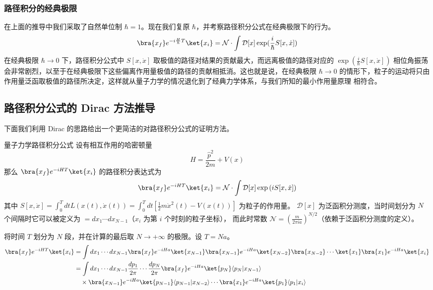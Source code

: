 \subsubsection{路径积分的经典极限}
在上面的推导中我们采取了自然单位制 $\hbar=1$。现在我们复原 $\hbar$，并考察路径积分公式在经典极限下的行为。
\begin{equation}
\bra{x_f} e^{-i\frac{H}{\hbar}T}\ket{x_i}=\mathcal{N}\cdot \int \mathcal{D}[x] \exp(\frac{i}{\hbar}S[x,\dot x])
\end{equation}
在经典极限 $\hbar\rightarrow 0$ 下，路径积分公式中 $S[x,\dot x]$ 取极值的路径对结果的贡献最大，而远离极值的路径对应的 $\exp(\frac{i}{\hbar}S[x,\dot x])$ 相位角振荡会非常剧烈，以至于在经典极限下这些偏离作用量极值的路径的贡献相抵消。这也就是说，在经典极限 $\hbar\rightarrow 0$ 的情形下，粒子的运动将只由作用量泛函取极值的路径所决定，这样就从量子力学的情况退化到了经典力学体系，与我们所知的最小作用量原理 相符合。

\subsection{路径积分公式的 Dirac 方法推导}
下面我们利用 Dirac 的思路给出一个更简洁的对路径积分公式的证明方法。
\begin{theorem}{量子力学路径积分公式}
    设有相互作用的哈密顿量
    \begin{equation}
        H=\frac{\hat p^2}{2m}+V(x)
    \end{equation}
    那么 $\bra{x_f}e^{-iHT}\ket{x_i}$ 的路径积分表达式为
    \begin{equation}
        \bra{x_f}e^{-iHT}\ket{x_i}=\mathcal{N}\cdot\int \mathcal D[x] \exp\left(iS[x,\dot x]\right)
    \end{equation}
    其中 $S[x,\dot x]=\int_0^T d t L(x(t),\dot x(t))=\int_0^T d t \left[\frac{1}{2}m\dot{x}^2(t)-V(x(t))\right]$ 为粒子的作用量。
    $\mathcal D[x]$ 为泛函积分测度，当时间划分为 $N$ 个间隔时它可以被定义为 $=d x_1\cdots d x_{N-1}$（$x_i$ 为第 $i$ 个时刻的粒子坐标），
    而此时常数 $\mathcal N=\left(\frac{m}{2\pi i a}\right)^{N/2}$（依赖于泛函积分测度的定义）。
\end{theorem}

将时间 $T$ 划分为 $N$ 段，并在计算的最后取 $N\rightarrow +\infty$ 的极限。设 $T=Na$。
\begin{equation}
\begin{aligned}
        \bra{x_f}e^{-iHT}\ket{x_i}&=\int d x_1\cdots d x_{N-1}
        \bra{x_f}e^{-iH a}\ket{x_{N-1}}\bra{x_{N-1}}e^{-iH a}
        \ket{x_{N-2}}\bra{x_{N-2}}\cdots \ket{x_{1}}\bra{x_{1}}e^{-iH a}\ket{x_i}
        \\
        &=\int d x_1\cdots d x_{N-1}\frac{d p_1}{2\pi} \cdots \frac{d p_N}{2\pi}
        \bra{x_f}e^{-iH a}\ket{p_N}\langle p_N|x_{N-1}\rangle 
        \\
        &\quad \times\bra{x_{N-1}}e^{-iH a}
        \ket{p_{N-1}}\langle p_{N-1}|x_{N-2}\rangle
        \cdots \bra{x_{1}}e^{-iH a}\ket{p_1}\langle p_1 | x_i\rangle
\end{aligned}
\end{equation}

